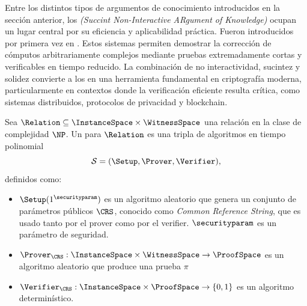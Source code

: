 
Entre los distintos tipos de argumentos de conocimiento introducidos en la sección anterior, los \textit{\SNARK (Succint Non-Interactive ARgument of Knowledge)} ocupan un lugar central por su eficiencia y aplicabilidad práctica. Fueron introducidos por primera vez en \cite{Bitansky2012}. Estos sistemas permiten demostrar la corrección de cómputos arbitrariamente complejos mediante pruebas extremadamente cortas y verificables en tiempo reducido. La combinación de no interactividad, sucintez y solidez convierte a los \SNARK en una herramienta fundamental en criptografía moderna, particularmente en contextos donde la verificación eficiente resulta crítica, como sistemas distribuidos, protocolos de privacidad y blockchain.

\begin{definition}[\SNARK, \zkSNARK]
	Sea $\Relation \subseteq \InstanceSpace \times \WitnessSpace$ una relación en la clase de complejidad $\NP$. Un \SNARK para $\Relation$ es una tripla de algoritmos en tiempo polinomial
	$$\mathcal{S} = (\Setup, \Prover, \Verifier),$$
	definidos como:
	\begin{itemize}
		\item $\Setup(1^\securityparam)$ es un algoritmo aleatorio que genera un conjunto de parámetros públicos $\CRS$, conocido como \textit{Common Reference String}, que es usado tanto por el prover como por el verifier. $\securityparam$ es un parámetro de seguridad.
		\item $\Prover_{\CRS}: \InstanceSpace \times \WitnessSpace \to \ProofSpace$ es un algoritmo aleatorio que produce una prueba $\pi$
		\item $\Verifier_\CRS: \InstanceSpace \times \ProofSpace \to \{0,1\}$ es un algoritmo determinístico.
	\end{itemize}
	

\end{definition}
